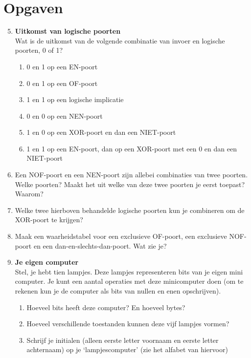 \documentclass[10pt,a4paper,titlepage]{article}
\newcommand{\1}{\'{e}\'{e}n}
\begin{document}
\newpage

\section*{Opgaven}


\begin{enumerate}
\setcounter{enumi}{4}
\item \textbf{Uitkomst van logische poorten}\\
Wat is de uitkomst van de volgende combinatie van invoer en logische poorten, 0 of 1?
\begin{enumerate}
\item 0 en 1 op een EN-poort
\item 0 en 1 op een OF-poort
\item 1 en 1 op een logische implicatie
\item 0 en 0 op een NEN-poort
\item 1 en 0 op een XOR-poort en dan een NIET-poort
\item 1 en 1 op een EN-poort, dan op een XOR-poort met een 0 en dan een NIET-poort
\end{enumerate}

\item Een NOF-poort en een NEN-poort zijn allebei combinaties van twee poorten. Welke poorten? Maakt het uit welke van deze twee poorten je eerst toepast? Waarom?
\item Welke twee hierboven behandelde logische poorten kun je combineren om de XOR-poort te krijgen?
\item Maak een waarheidstabel voor een exclusieve OF-poort, een exclusieve NOF-poort en een dan-en-slechts-dan-poort. Wat zie je?

\item \textbf{Je eigen computer}\\
Stel, je hebt tien lampjes. Deze lampjes representeren bits van je eigen mini computer. Je kunt een aantal operaties met deze minicomputer doen (om te rekenen kun je de computer als bits van nullen en enen opschrijven).
\begin{enumerate}
\item Hoeveel bits heeft deze computer? En hoeveel bytes?
\item Hoeveel verschillende toestanden kunnen deze vijf lampjes vormen?
\item Schrijf je initialen (alleen eerste letter voornaam en eerste letter achternaam) op je `lampjescomputer' (zie het alfabet van hiervoor)


\end{enumerate}
\end{enumerate}
\end{document}
